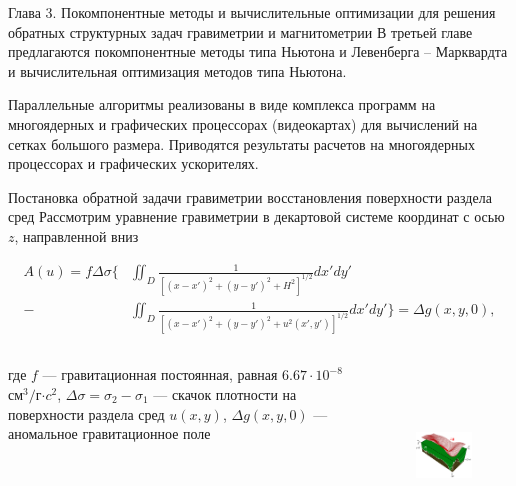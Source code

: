 \documentclass[10pt,pdf, mathserif, hyperref={unicode}]{beamer}
\begin{document}
\begin{frame}{Глава 3. Покомпонентные методы и вычислительные оптимизации для решения обратных структурных задач гравиметрии и магнитометрии}
	В третьей главе предлагаются покомпонентные методы типа Ньютона и Левенберга -- Марквардта и вычислительная оптимизация методов типа Ньютона. 
	
	Параллельные алгоритмы реализованы в виде комплекса программ на многоядерных и графических процессорах (видеокартах) для вычислений на сетках большого размера. Приводятся результаты расчетов на многоядерных процессорах и графических ускорителях. 
	
\end{frame}

\begin{frame}{Постановка обратной задачи гравиметрии восстановления поверхности раздела сред}
	Рассмотрим уравнение гравиметрии в декартовой системе координат с осью $z$, направленной вниз 

	\begin{equation*}
	\begin{aligned}
	A(u)=f\Delta\sigma \bigg\{ &\iint_{D} \frac{1}{[(x-x')^2+(y-y')^2+H^2]^{1/2}}dx'dy' \\
	- &\iint_{D} \frac{1}{[(x-x')^2+(y-y')^2+u^2(x',y')]^{1/2}}dx'dy'\bigg\}=\Delta g(x,y,0),
	\end{aligned} 
	\end{equation*}

	\begin{columns}
		где $f$ --- гравитационная постоянная, равная $6.67\cdot10^{-8}$ см$^3/$г$\cdot c^2$, $\Delta\sigma=\sigma_2-\sigma_1$ --- скачок плотности на поверхности раздела сред $u(x,y)$, $\Delta g(x,y,0)$ --- аномальное гравитационное поле%
		\begin{figure}[h]
			\centering
			\includegraphics[height=4cm]{grav_illust.png}
			\label{fig:twolayer}
		\end{figure}
	\end{columns}
\end{frame}
\end{document}
